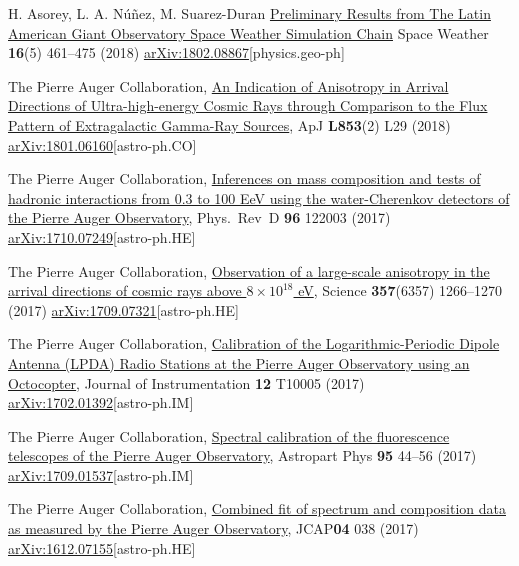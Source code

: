 \begin{etaremune}
\item {}H. Asorey, L. A. Núñez, M. Suarez-Duran \href{https://doi.org/10.1002/2017SW001774}{{Preliminary Results from The Latin American Giant Observatory Space Weather Simulation Chain}} Space Weather {\textbf{16}}(5) 461--475 (2018) \href{https://arxiv.org/abs/1802.08867}{arXiv:1802.08867}[physics.geo-ph]

\item {}The Pierre Auger Collaboration, \href{https://doi.org/10.3847/2041-8213/aaa66d}{{An Indication of Anisotropy in Arrival Directions of Ultra-high-energy Cosmic Rays through Comparison to the Flux Pattern of Extragalactic Gamma-Ray Sources}}, ApJ {\textbf{L853}}(2) L29 (2018) \href{https://arxiv.org/abs/1801.06160}{arXiv:1801.06160}[astro-ph.CO]
	
\item {}The Pierre Auger Collaboration, \href{https://doi.org/10.1103/PhysRevD.96.122003}{{Inferences on mass composition and tests of hadronic interactions from 0.3 to 100 EeV using the water-Cherenkov detectors of the Pierre Auger Observatory}}, Phys.\ Rev\  D {\textbf{96}} 122003 (2017) \href{https://arxiv.org/abs/1710.07249}{arXiv:1710.07249}[astro-ph.HE]

\item {}The Pierre Auger Collaboration, \href{https://doi.org/10.1126/science.aan4338}{{Observation of a large-scale anisotropy in the arrival directions of cosmic rays above $8\times 10^{18}$ eV}}, Science {\textbf{357}}(6357) 1266--1270 (2017) \href{https://arxiv.org/abs/1709.07321}{arXiv:1709.07321}[astro-ph.HE]

\item {}The Pierre Auger Collaboration, \href{https://doi.org/10.1088/1748-0221/12/10/T10005}{{Calibration of the Logarithmic-Periodic Dipole Antenna (LPDA) Radio Stations at the Pierre Auger Observatory using an Octocopter}}, Journal of Instrumentation {\textbf{12}} T10005 (2017) \href{http://arxiv.org/abs/1702.01392}{arXiv:1702.01392}[astro-ph.IM]

\item {}The Pierre Auger Collaboration, \href{https://doi.org/10.1016/j.astropartphys.2017.09.001}{{Spectral calibration of the fluorescence telescopes of the Pierre Auger Observatory}}, Astropart Phys {\textbf{95}} 44--56 (2017) \href{https://arxiv.org/abs/1709.01537}{arXiv:1709.01537}[astro-ph.IM]

\item {}The Pierre Auger Collaboration, \href{https://doi.org/10.1088/1475-7516/2017/04/038}{{Combined fit of spectrum and composition data as measured by the Pierre Auger Observatory}}, JCAP{\textbf{04}} 038 (2017) \href{http://arxiv.org/abs/1612.07155}{arXiv:1612.07155}[astro-ph.HE]


\end{etaremune}
